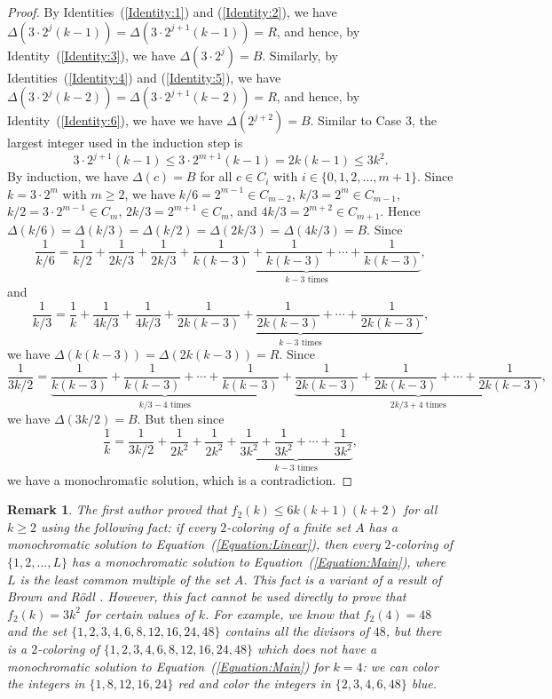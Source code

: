 \documentclass[10pt,a4paper]{amsart}
\newtheorem{remark}[theorem]{Remark}
\begin{document}
\begin{proof}
By Identities~(\ref{Identity:1}) and (\ref{Identity:2}), we have $\Delta(3\cdot2^{j}(k-1))=\Delta(3\cdot2^{j+1}(k-1))= R$, and hence, by Identity~(\ref{Identity:3}), we have $\Delta(3\cdot2^{j})=B$. Similarly, by Identities~(\ref{Identity:4}) and (\ref{Identity:5}), we have $\Delta(3\cdot2^{j}(k-2))=\Delta(3\cdot2^{j+1}(k-2))=R$, and hence, by Identity~(\ref{Identity:6}), we have we have $\Delta(2^{j+2})=B$. Similar to Case 3, the largest integer used in the induction step is
\[
3\cdot2^{j+1}(k-1)\leq 3\cdot2^{m+1}(k-1)=2k(k-1)\leq 3k^2.
\]
By induction, we have $\Delta(c)=B$ for all $c\in C_i$ with $i\in\{0,1,2,\ldots,m+1\}$. Since $k=3\cdot2^m$ with $m\geq2$, we have $k/6=2^{m-1}\in C_{m-2}$, $k/3=2^m\in C_{m-1}$, $k/2=3\cdot 2^{m-1}\in C_{m}$, $2k/3=2^{m+1}\in C_m$, and $4k/3=2^{m+2}\in C_{m+1}$. Hence $\Delta(k/6)=\Delta(k/3)=\Delta(k/2)=\Delta(2k/3)=\Delta(4k/3)=B$. Since
\[
\frac{1}{k/6}=\frac{1}{k/2}+\frac{1}{2k/3}+\frac{1}{2k/3}+\underbrace{\frac{1}{k(k-3)}+\frac{1}{k(k-3)}+\cdots+\frac{1}{k(k-3)}}_{k-3\text{ times}},
\]
and
\[
\frac{1}{k/3}=\frac{1}{k}+\frac{1}{4k/3}+\frac{1}{4k/3}+\underbrace{\frac{1}{2k(k-3)}+\frac{1}{2k(k-3)}+\cdots+\frac{1}{2k(k-3)}}_{k-3\text{ times}},
\]
we have $\Delta(k(k-3))=\Delta(2k(k-3))=R$. Since
\[
\frac{1}{3k/2}=\underbrace{\frac{1}{k(k-3)}+\frac{1}{k(k-3)}+\cdots+\frac{1}{k(k-3)}}_{k/3-4\text{ times}}+\underbrace{\frac{1}{2k(k-3)}+\frac{1}{2k(k-3)}+\cdots+\frac{1}{2k(k-3)}}_{2k/3+4\text{ times}},
\]
we have $\Delta(3k/2)=B$. But then since
    \[
    \frac{1}{k}=\frac{1}{3k/2}+\frac{1}{2k^2}+\frac{1}{2k^2}+\underbrace{\frac{1}{3k^2}+\frac{1}{3k^2}+\cdots+\frac{1}{3k^2}}_{k-3\text{ times}},
    \]
    we have a monochromatic solution, which is a contradiction.
\end{proof}






\begin{remark}
    The first author \cite{Gaiser2024} proved that $f_2(k)\leq 6k(k+1)(k+2)$ for all $k\geq2$ using the following fact: if every $2$-coloring of a finite set $A$ has a monochromatic solution to Equation~(\ref{Equation:Linear}), then every $2$-coloring of $\{1,2,\ldots,L\}$ has a monochromatic solution to Equation~(\ref{Equation:Main}), where $L$ is the least common multiple of the set $A$. This fact is a variant of a result of Brown and R\"{o}dl \cite{BrownRodl1991}. However, this fact cannot be used directly to prove that $f_2(k)=3k^2$ for certain values of $k$. For example, we know that $f_2(4)=48$ and the set $\{1,2,3,4,6,8,12,16,24,48\}$ contains all the divisors of $48$, but there is a $2$-coloring of $\{1,2,3,4,6,8,12,16,24,48\}$ which does not have a monochromatic solution to Equation~(\ref{Equation:Main}) for $k=4$: we can color the integers in $\{1,8,12,16,24\}$ red and color the integers in $\{2,3,4,6,48\}$ blue.
\end{remark}
\end{document}
